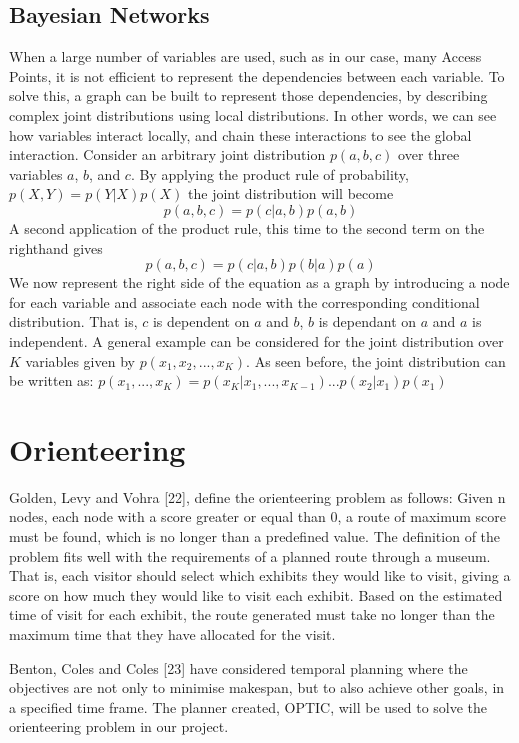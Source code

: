 \subsection{Bayesian Networks}
When a large number of variables are used, such as in our case, many Access Points, it is not efficient to represent the dependencies between each variable. To solve this, a graph can be built to represent those dependencies, by describing complex joint distributions using local distributions. In other words, we can see how variables interact locally, and chain these interactions to see the global interaction.
Consider an arbitrary joint distribution $p(a,b,c)$ over three variables $a$, $b$, and $c$.
By applying the product rule of probability, $p(X,Y) = p(Y|X)p(X)$ the joint distribution will become $$p(a,b,c) = p(c|a,b)p(a,b)$$
A second application of the product rule, this time to the second term on the righthand gives $$p(a,b,c) = p(c|a, b)p(b|a)p(a)$$
We now represent the right side of the equation as a graph by introducing a node for each variable and associate each node with the corresponding conditional distribution. That is, $c$ is dependent on $a$ and $b$, $b$ is dependant on $a$ and $a$ is independent. A general example can be considered for the joint distribution over $K$ variables given by $p(x_1,x_2,...,x_K)$. As seen before, the joint distribution can be written as: $p(x_1,...,x_K) = p(x_K|x_1,...,x_{K-1})...p(x_2|x_1)p(x_1)$

\section{Orienteering}
Golden, Levy and Vohra [22], define the orienteering problem as follows: Given n nodes, each node with a score greater or equal than 0, a route of maximum score must be found, which is no longer than a predefined value. The definition of the problem fits well with the requirements of a planned route through a museum. That is, each visitor should select which exhibits they would like to visit, giving a score on how much they would like to visit each exhibit. Based on the estimated time of visit for each exhibit, the route generated must take no longer than the maximum time that they have allocated for the visit.

Benton, Coles and Coles [23] have considered temporal planning where the objectives are not only to minimise makespan, but to also achieve other goals, in a specified time frame. The planner created, OPTIC, will be used to solve the orienteering problem in our project.







